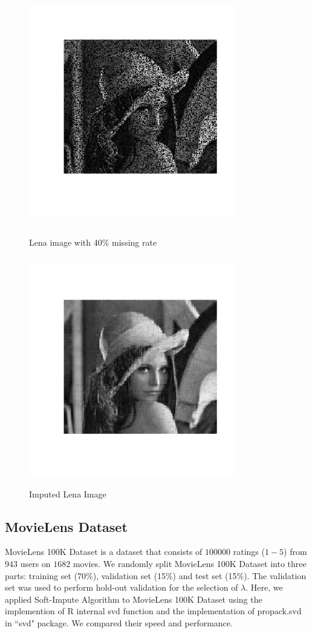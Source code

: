 \documentclass[12pt]{article}
\begin{document}
\begin{figure}[H]
	\centering
	\begin{minipage}[c]{0.49\textwidth}
		\includegraphics[angle=0,width=9cm,height=10cm]{lena4}
		\caption{Lena image with 40\% missing rate}\label{lena4}
	\end{minipage}
	\begin{minipage}[c]{0.49\textwidth}
		\includegraphics[angle=0,width=9cm,height=10cm]{lena5}
		\caption{Imputed Lena Image}\label{lena5}
	\end{minipage}
\end{figure}

\subsection{MovieLens Dataset}
MovieLens 100K Dataset is a dataset that consists of $100000$ ratings ($1-5$) from $943$ users on $1682$ movies. We randomly split MovieLens 100K Dataset into three parts: training set (70\%), validation
set (15\%) and test set (15\%). The validation set was used to perform hold-out validation for the selection of $\lambda$. Here, we applied Soft-Impute Algorithm to MovieLens 100K Dataset using the implemention of R internal svd function and the implementation of propack.svd in ``svd" package. We compared their speed and performance. 
\end{document}
